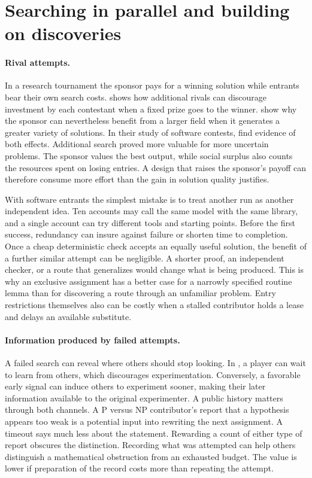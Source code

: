 \documentclass[11pt,letterpaper]{article}
\begin{document}
\section{Searching in parallel and building on discoveries}

\paragraph{Rival attempts.}
In a research tournament the sponsor pays for a winning solution while entrants bear their own search costs. \citet{taylor} shows how additional rivals can discourage investment by each contestant when a fixed prize goes to the winner. \citet{terwiesch} show why the sponsor can nevertheless benefit from a larger field when it generates a greater variety of solutions. In their study of software contests, \citet{boudreau} find evidence of both effects. Additional search proved more valuable for more uncertain problems. The sponsor values the best output, while social surplus also counts the resources spent on losing entries. A design that raises the sponsor's payoff can therefore consume more effort than the gain in solution quality justifies.

With software entrants the simplest mistake is to treat another run as another independent idea. Ten accounts may call the same model with the same library, and a single account can try different tools and starting points. Before the first success, redundancy can insure against failure or shorten time to completion. Once a cheap deterministic check accepts an equally useful solution, the benefit of a further similar attempt can be negligible. A shorter proof, an independent checker, or a route that generalizes would change what is being produced. This is why an exclusive assignment has a better case for a narrowly specified routine lemma than for discovering a route through an unfamiliar problem. Entry restrictions themselves also can be costly when a stalled contributor holds a lease and delays an available substitute.

\paragraph{Information produced by failed attempts.}
A failed search can reveal where others should stop looking. In \citet{bolton}, a player can wait to learn from others, which discourages experimentation. Conversely, a favorable early signal can induce others to experiment sooner, making their later information available to the original experimenter. A public history matters through both channels. A P versus NP contributor's report that a hypothesis appears too weak is a potential input into rewriting the next assignment. A timeout says much less about the statement. Rewarding a count of either type of report obscures the distinction. Recording what was attempted can help others distinguish a mathematical obstruction from an exhausted budget. The value is lower if preparation of the record costs more than repeating the attempt.
\end{document}
